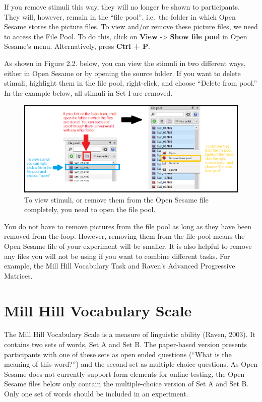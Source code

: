 \documentclass[
]{book}
\begin{document}
If you remove stimuli this way, they will no longer be shown to participants. They will, however, remain in the ``file pool'', i.e.~the folder in which Open Sesame stores the picture files. To view and/or remove these picture files, we need to access the File Pool. To do this, click on \textbf{View} -\textgreater{} \textbf{Show file pool} in Open Sesame's menu. Alternatively, press \textbf{Ctrl + P}.

As shown in Figure 2.2. below, you can view the stimuli in two different ways, either in Open Sesame or by opening the source folder. If you want to delete stimuli, highlight them in the file pool, right-click, and choose ``Delete from pool.'' In the example below, all stimuli in Set I are removed.

\begin{figure}

{\centering \includegraphics[width=0.99\linewidth]{images/AdvancedRPMFilePool} 

}

\caption{To view stimuli, or remove them from the Open Sesame file completely, you need to open the file pool.}\label{fig:Figure1-2}
\end{figure}

You do not have to remove pictures from the file pool as long as they have been removed from the loop. However, removing them from the file pool means the Open Sesame file of your experiment will be smaller. It is also helpful to remove any files you will not be using if you want to combine different tasks. For example, the Mill Hill Vocabulary Task and Raven's Advanced Progressive Matrices.

\hypertarget{mill-hill-vocabulary-scale}{%
\section{Mill Hill Vocabulary Scale}\label{mill-hill-vocabulary-scale}}

The Mill Hill Vocabulary Scale is a measure of linguistic ability (Raven, 2003). It contains two sets of words, Set A and Set B. The paper-based version presents participants with one of these sets as open ended questions (``What is the meaning of this word?'') and the second set as multiple choice questions. As Open Sesame does not currently support form elements for online testing, the Open Sesame files below only contain the multiple-choice version of Set A and Set B. Only one set of words should be included in an experiment.
\end{document}
